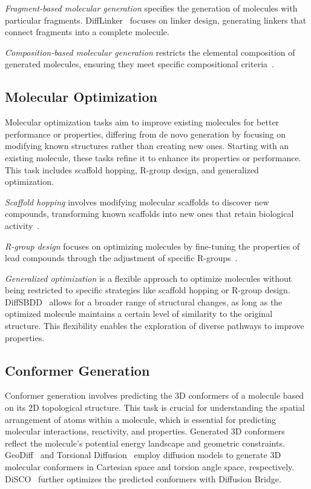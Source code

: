 \textit{Fragment-based molecular generation} specifies the generation of molecules with particular fragments. DiffLinker~\citep{DiffLinker} focuses on linker design, generating linkers that connect fragments into a complete molecule.


\textit{Composition-based molecular generation} restricts the elemental composition of generated molecules, ensuring they meet specific compositional criteria~\citep{UniMat}.


\subsection{Molecular Optimization}
Molecular optimization tasks aim to improve existing molecules for better performance or properties, differing from de novo generation by focusing on modifying known structures rather than creating new ones. Starting with an existing molecule, these tasks refine it to enhance its properties or performance. This task includes scaffold hopping, R-group design, and generalized optimization.


\textit{Scaffold hopping} involves modifying molecular scaffolds to discover new compounds, transforming known scaffolds into new ones that retain biological activity~\citep{DiffHopp}.


\textit{R-group design} focuses on optimizing molecules by fine-tuning the properties of lead compounds through the adjustment of specific R-groups~\citep{DecompOpt}.


\textit{Generalized optimization} is a flexible approach to optimize molecules without being restricted to specific strategies like scaffold hopping or R-group design. 
DiffSBDD~\citep{DiffSBDD} allows for a broader range of structural changes, as long as the optimized molecule maintains a certain level of similarity to the original structure. This flexibility enables the exploration of diverse pathways to improve properties.


\subsection{Conformer Generation}
Conformer generation involves predicting the 3D conformers of a molecule based on its 2D topological structure. This task is crucial for understanding the spatial arrangement of atoms within a molecule, which is essential for predicting molecular interactions, reactivity, and properties.
Generated 3D conformers reflect the molecule's potential energy landscape and geometric constraints.
GeoDiff~\citep{GeoDiff} and Torsional Diffusion~\citep{TorsionalDiffusion} employ diffusion models to generate 3D molecular conformers in Cartesian space and torsion angle space, respectively. DiSCO~\citep{DiSCO} further optimizes the predicted conformers with Diffusion Bridge.



